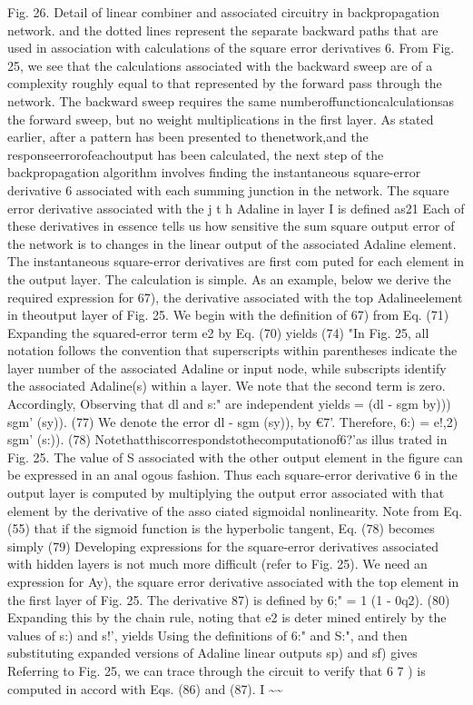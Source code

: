 \documentclass[11pt,a4paper,twocolumn]{article}
\begin{document}
{{Fig. 26. Detail of linear combiner and associated circuitry 
in backpropagation network. 
and the dotted lines represent the separate backward paths 
that are used in association with calculations of the square 
error derivatives 6. From Fig. 25, we see that the calculations 
associated with the backward sweep are of a complexity 
roughly equal to that represented by the forward pass 
through the network. The backward sweep requires the 
same numberoffunctioncalculationsas the forward sweep, 
but no weight multiplications in the first layer. 
As stated earlier, after a pattern has been presented to 
thenetwork,and the responseerrorofeachoutput has been 
calculated, the next step of the backpropagation algorithm 
involves finding the instantaneous square-error derivative 
6 associated with each summing junction in the network. 
The square error derivative associated with the j t h  Adaline 
in layer I is defined as21 
Each of these derivatives in essence tells us how sensitive 
the sum square output error of the network is to changes 
in the linear output of the associated Adaline element. 
The instantaneous square-error derivatives are first com
puted for each element in the output layer. The calculation 
is simple. As an example, below we derive the required 
expression for 67), the derivative associated with the top 
Adalineelement in theoutput layer of Fig. 25. We begin with 
the definition of 67) from Eq. (71) 
Expanding the squared-error term e2 by Eq. (70) yields 
(74) 
"In Fig. 25, all notation follows the convention that superscripts 
within parentheses indicate the layer number of the associated 
Adaline or input node, while subscripts identify the associated 
Adaline(s) within a layer. 
We note that the second term is zero. Accordingly, 
Observing that dl and s:" are independent yields 
= (dl - sgm by))) sgm' (sy)). 
(77) 
We denote the error dl - sgm (sy)), by €7'. Therefore, 
6:) 
= e!,2) sgm' (s:)). 
(78) 
Notethatthiscorrespondstothecomputationof6?'as 
illus
trated in Fig. 25. The value of S associated with the other 
output element in the figure can be expressed in an anal
ogous fashion. Thus each square-error derivative 6 in the 
output layer is computed by multiplying the output error 
associated with that element by the derivative of the asso
ciated sigmoidal nonlinearity. Note from Eq. (55) that if the 
sigmoid function is the hyperbolic tangent, Eq. (78) becomes 
simply 
(79) 
Developing expressions for the square-error derivatives 
associated with hidden layers is not much more difficult 
(refer to Fig. 25). We need an expression for Ay), the square
error derivative associated with the top element in the first 
layer of Fig. 25. The derivative 87) is defined by 
6;" = 1 (1 - 0q2). 
(80) 
Expanding this by the chain rule, noting that e2 is deter
mined entirely by the values of s:) 
and s!', 
yields 
Using the definitions of 6:" and S:", and then substituting 
expanded versions of Adaline linear outputs sp) and 
sf) gives 
Referring to Fig. 25, we can trace through the circuit to 
verify that 6 7 )  is computed in accord with Eqs. (86) and (87). 
I 
\~{}\~{}




}}
\end{document}
